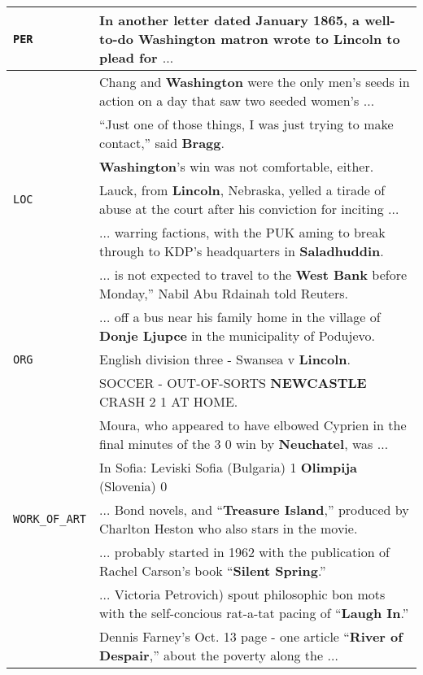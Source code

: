 \documentclass[11pt,letterpaper,UTF8]{article}
\begin{document}
\begin{table*}[t!]
\begin{center}
{\footnotesize
\begin{tabular}{|l|l|}
\hline
\texttt{PER} & In another letter dated January 1865, a well-to-do Washington matron wrote to \textbf{Lincoln} to plead for $\ldots$ \\
\hline
& Chang and \textbf{Washington} were the only men's seeds in action on a day that saw two seeded women's $\ldots$ \\
& ``Just one of those things, I was just trying to make contact,'' said \textbf{Bragg}. \\
& \textbf{Washington}'s win was not comfortable, either. \\
\hline
\texttt{LOC} & Lauck, from \textbf{Lincoln}, Nebraska, yelled a tirade of abuse at the court after his conviction for inciting $\ldots$ \\
\hline
&$\ldots$ warring factions, with the PUK aming to break through to KDP's headquarters in \textbf{Saladhuddin}. \\
&$\ldots$ is not expected to travel to the \textbf{West Bank} before Monday,'' Nabil Abu Rdainah told Reuters. \\
&$\ldots$ off a bus near his family home in the village of \textbf{Donje Ljupce} in the municipality of Podujevo. \\
\hline
\texttt{ORG} & English division three - Swansea v \textbf{Lincoln}. \\
\hline
&SOCCER - OUT-OF-SORTS \textbf{NEWCASTLE} CRASH 2 1 AT HOME. \\
&Moura, who appeared to have elbowed Cyprien in the final minutes of the 3 0 win by \textbf{Neuchatel}, was $\ldots$ \\
&In Sofia: Leviski Sofia (Bulgaria) 1 \textbf{Olimpija} (Slovenia) 0 \\
\hline
\texttt{WORK\_OF\_ART} &  $\ldots$ Bond novels, and ``\textbf{Treasure Island},'' produced by Charlton Heston who also stars in the movie. \\
\hline
&$\ldots$ probably started in 1962 with the publication of Rachel Carson's book ``\textbf{Silent Spring}.'' \\
&$\ldots$ Victoria Petrovich) spout philosophic bon mots with the self-concious rat-a-tat pacing of ``\textbf{Laugh In}.'' \\
&Dennis Farney's Oct. 13 page - one article ``\textbf{River of Despair},'' about the poverty along the $\ldots$ \\
\hline

\end{tabular}}
\end{center}
\end{table*}
\end{document}
